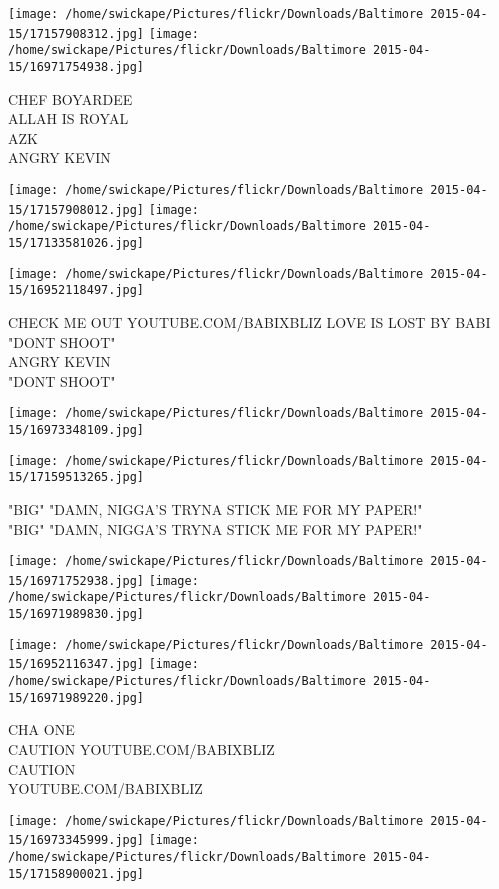 \documentclass[10pt,letterpaper]{article}
\begin{document}
\texttt{[image: /home/swickape/Pictures/flickr/Downloads/Baltimore 2015-04-15/17157908312.jpg]}
\texttt{[image: /home/swickape/Pictures/flickr/Downloads/Baltimore 2015-04-15/16971754938.jpg]}

CHEF BOYARDEE\\
ALLAH IS ROYAL\\
AZK\\
ANGRY KEVIN
\pagebreak

\texttt{[image: /home/swickape/Pictures/flickr/Downloads/Baltimore 2015-04-15/17157908012.jpg]}
\texttt{[image: /home/swickape/Pictures/flickr/Downloads/Baltimore 2015-04-15/17133581026.jpg]}

\texttt{[image: /home/swickape/Pictures/flickr/Downloads/Baltimore 2015-04-15/16952118497.jpg]}

CHECK ME OUT YOUTUBE.COM/BABIXBLIZ LOVE IS LOST BY BABI "DONT SHOOT"\\
ANGRY KEVIN\\
"DONT SHOOT"
\pagebreak

\texttt{[image: /home/swickape/Pictures/flickr/Downloads/Baltimore 2015-04-15/16973348109.jpg]}

\vspace{0.25in}
\texttt{[image: /home/swickape/Pictures/flickr/Downloads/Baltimore 2015-04-15/17159513265.jpg]}

"BIG" "DAMN, NIGGA'S TRYNA STICK ME FOR MY PAPER!"\\
"BIG" "DAMN, NIGGA'S TRYNA STICK ME FOR MY PAPER!"
\pagebreak

\texttt{[image: /home/swickape/Pictures/flickr/Downloads/Baltimore 2015-04-15/16971752938.jpg]}
\texttt{[image: /home/swickape/Pictures/flickr/Downloads/Baltimore 2015-04-15/16971989830.jpg]}

\texttt{[image: /home/swickape/Pictures/flickr/Downloads/Baltimore 2015-04-15/16952116347.jpg]}
\texttt{[image: /home/swickape/Pictures/flickr/Downloads/Baltimore 2015-04-15/16971989220.jpg]}

CHA ONE\\
CAUTION YOUTUBE.COM/BABIXBLIZ\\
CAUTION\\
YOUTUBE.COM/BABIXBLIZ
\pagebreak

\texttt{[image: /home/swickape/Pictures/flickr/Downloads/Baltimore 2015-04-15/16973345999.jpg]}
\texttt{[image: /home/swickape/Pictures/flickr/Downloads/Baltimore 2015-04-15/17158900021.jpg]}
\end{document}
